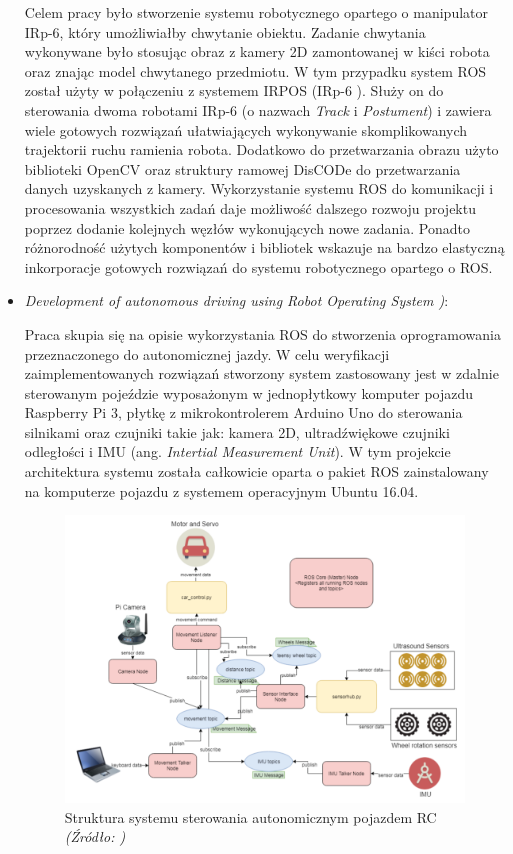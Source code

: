 \documentclass[a4paper, 12pt, twoside]{article}
\begin{document}
\begin{itemize}
Celem pracy było stworzenie systemu robotycznego opartego o manipulator IRp-6, który umożliwiałby chwytanie obiektu. Zadanie chwytania wykonywane było stosując obraz z kamery 2D zamontowanej w kiści robota oraz znając model chwytanego przedmiotu. W tym przypadku system ROS został użyty w połączeniu z systemem IRPOS (IRp-6 ). Służy on do sterowania dwoma robotami IRp-6 (o nazwach \textit{Track} i \textit{Postument}) i zawiera wiele gotowych rozwiązań ułatwiających wykonywanie skomplikowanych trajektorii ruchu ramienia robota. Dodatkowo do przetwarzania obrazu użyto biblioteki OpenCV oraz struktury ramowej DisCODe do przetwarzania danych uzyskanych z kamery. Wykorzystanie systemu ROS do komunikacji i procesowania wszystkich zadań daje możliwość dalszego rozwoju projektu poprzez dodanie kolejnych węzłów wykonujących nowe zadania. Ponadto różnorodność użytych komponentów i bibliotek wskazuje na bardzo elastyczną inkorporacje gotowych rozwiązań do systemu robotycznego opartego o ROS.

\item \textit{Development of autonomous driving using Robot Operating System \cite{thesiszivkovic})}:

Praca skupia się na opisie wykorzystania ROS do stworzenia oprogramowania przeznaczonego do autonomicznej jazdy. W celu weryfikacji zaimplementowanych rozwiązań stworzony system zastosowany jest w zdalnie sterowanym pojeździe wyposażonym w jednopłytkowy komputer pojazdu Raspberry Pi 3, płytkę z mikrokontrolerem Arduino Uno do sterowania silnikami oraz czujniki takie jak: kamera 2D, ultradźwiękowe czujniki odległości i IMU (ang. \textit{Intertial Measurement Unit}). W tym projekcie architektura systemu została całkowicie oparta o pakiet ROS zainstalowany na komputerze pojazdu z systemem operacyjnym Ubuntu 16.04.

\begin{figure}[hbt!]
\centering
\includegraphics[width=0.8\linewidth]{images/autonomous_car_system.png}
\caption{Struktura systemu sterowania autonomicznym pojazdem RC\textit{ (Źródło: \cite{thesiszivkovic}) } }
\label{fig:autonomous_car_scheme}
\end{figure}


\end{itemize}
\end{document}
